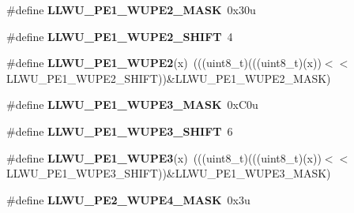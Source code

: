 \begin{DoxyCompactItemize}
\item 
\mbox{\label{group___l_l_w_u___register___masks_ga97e8e2fc8ce673f6b4625d307bc94b4a}} 
\#define {\bfseries L\+L\+W\+U\+\_\+\+P\+E1\+\_\+\+W\+U\+P\+E2\+\_\+\+M\+A\+SK}~0x30u
\item 
\mbox{\label{group___l_l_w_u___register___masks_ga0b1bb86eb31a82a18ad1491b0305000b}} 
\#define {\bfseries L\+L\+W\+U\+\_\+\+P\+E1\+\_\+\+W\+U\+P\+E2\+\_\+\+S\+H\+I\+FT}~4
\item 
\mbox{\label{group___l_l_w_u___register___masks_gae6a462624a848afff074ae6e6da83cb0}} 
\#define {\bfseries L\+L\+W\+U\+\_\+\+P\+E1\+\_\+\+W\+U\+P\+E2}(x)~(((uint8\+\_\+t)(((uint8\+\_\+t)(x))$<$$<$L\+L\+W\+U\+\_\+\+P\+E1\+\_\+\+W\+U\+P\+E2\+\_\+\+S\+H\+I\+FT))\&L\+L\+W\+U\+\_\+\+P\+E1\+\_\+\+W\+U\+P\+E2\+\_\+\+M\+A\+SK)
\item 
\mbox{\label{group___l_l_w_u___register___masks_ga44cae929b3178e210eb5e1346a4ce997}} 
\#define {\bfseries L\+L\+W\+U\+\_\+\+P\+E1\+\_\+\+W\+U\+P\+E3\+\_\+\+M\+A\+SK}~0x\+C0u
\item 
\mbox{\label{group___l_l_w_u___register___masks_gaceee1b1b6323ba4d33abf875718e885a}} 
\#define {\bfseries L\+L\+W\+U\+\_\+\+P\+E1\+\_\+\+W\+U\+P\+E3\+\_\+\+S\+H\+I\+FT}~6
\item 
\mbox{\label{group___l_l_w_u___register___masks_ga3dfb03917664cd276f352b77e95624b9}} 
\#define {\bfseries L\+L\+W\+U\+\_\+\+P\+E1\+\_\+\+W\+U\+P\+E3}(x)~(((uint8\+\_\+t)(((uint8\+\_\+t)(x))$<$$<$L\+L\+W\+U\+\_\+\+P\+E1\+\_\+\+W\+U\+P\+E3\+\_\+\+S\+H\+I\+FT))\&L\+L\+W\+U\+\_\+\+P\+E1\+\_\+\+W\+U\+P\+E3\+\_\+\+M\+A\+SK)
\item 
\mbox{\label{group___l_l_w_u___register___masks_ga94128d26c60f13d22acf47200f4f37e0}} 
\#define {\bfseries L\+L\+W\+U\+\_\+\+P\+E2\+\_\+\+W\+U\+P\+E4\+\_\+\+M\+A\+SK}~0x3u
\item 
\mbox{\label{group___l_l_w_u___register___masks_ga12aa6ffb998e5273a8dd548ac434ad41}} 

\end{DoxyCompactItemize}
